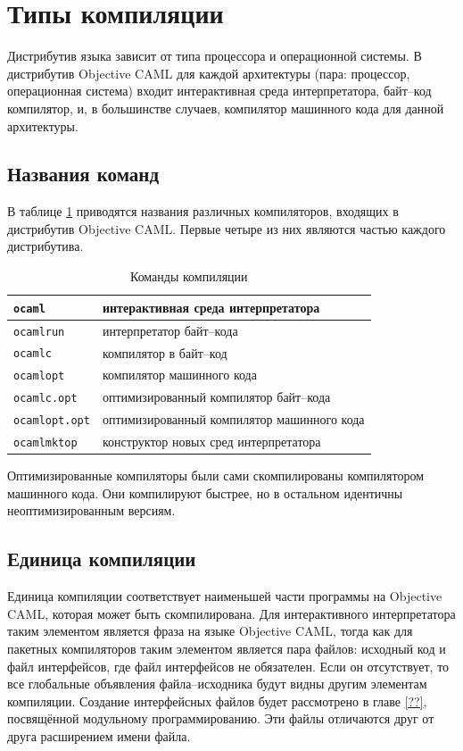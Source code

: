 \section{Типы компиляции}
\label{sec:compilation}

Дистрибутив языка зависит от типа процессора и операционной системы. В
дистрибутив Objective CAML для каждой архитектуры (пара: процессор, операционная
система) входит интерактивная среда интерпретатора, байт--код компилятор, и, в
большинстве случаев, компилятор машинного кода для данной архитектуры.

\subsection{Названия команд}
\label{subsec:command_names}

В таблице \ref{tbl:commands_for_compiling} приводятся названия различных
компиляторов, входящих в дистрибутив Objective CAML. Первые четыре из них
являются частью каждого дистрибутива.

\begin{table}
	\begin{tabular}{|l|l|}
	\hline
	\texttt{ocaml} & интерактивная среда интерпретатора \\
	\hline
	\texttt{ocamlrun} & интерпретатор байт--кода \\
	\hline
	\texttt{ocamlc} & компилятор в байт--код \\
	\hline
	\texttt{ocamlopt} & компилятор машинного кода \\
	\hline
	\texttt{ocamlc.opt} & оптимизированный компилятор байт--кода \\
	\hline
	\texttt{ocamlopt.opt} & оптимизированный компилятор машинного кода \\
	\hline
	\texttt{ocamlmktop} & конструктор новых сред интерпретатора \\
	\hline
	\end{tabular}
	\caption{\label{tbl:commands_for_compiling}Команды
компиляции}
\end{table}

Оптимизированные компиляторы были сами скомпилированы компилятором машинного
кода. Они компилируют быстрее, но в остальном идентичны неоптимизированным
версиям.

\subsection{Единица компиляции}

Единица компиляции соответствует наименьшей части программы на Objective CAML,
которая может быть скомпилирована. Для интерактивного интерпретатора таким
элементом является фраза на языке Objective CAML, тогда как для пакетных
компиляторов таким элементом является пара файлов: исходный код и файл
интерфейсов, где файл интерфейсов не обязателен. Если он отсутствует, то все
глобальные объявления файла--исходника будут видны другим элементам компиляции.
Создание интерфейсных файлов будет рассмотрено в главе \ref{??}, посвящённой
модульному программированию. Эти файлы отличаются друг от друга расширением
имени файла.

